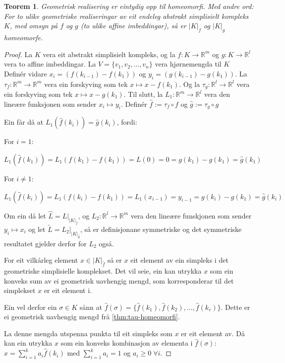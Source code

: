 \documentclass[a4paper, 12pt, norsk]{article}
\theoremstyle{plain}
\newtheorem{theorem}{Teorem}[section]
\theoremstyle{definition}
\newcommand{\Rb}{\mathbb{R}}
\newcommand{\gr}[1]{ \lvert #1 \rvert } %
\begin{document}
\begin{theorem} \label{thm:gr-eintydig}
	Geometrisk realisering er eintydig opp til homeomorfi. Med andre ord: For to ulike geometriske realiseringar av eit endeleg abstrakt simplisielt kompleks $K$, med omsyn på $f$ og $g$ (to ulike affine imbeddingar), så er $\gr{K}_f$ og $\gr{K}_g$ homeomorfe.
\end{theorem}

\begin{proof}
	La $K$ vera eit abstrakt simplisielt kompleks, og la $f:K\to\Rb^m$ og $g:K\to\Rb^l$ vera to affine imbeddingar. La $V=\{ v_1, v_2, \dots, v_n \}$ vera hjørnemengda til $K$ Definér vidare $x_i=(f(k_{i-1})-f(k_1))$ og $y_i=(g(k_{i-1})-g(k_1))$. La $\tau_f:\Rb^m\to\Rb^m$ vera ein forskyving som tek $x\mapsto x-f(k_1)$. Og la $\tau_g:\Rb^l\to\Rb^l$ vera ein forskyving som tek $x\mapsto x-g(k_1)$. Til slutt, la $L_1:\Rb^m\to\Rb^l$ vera den lineære funksjonen som sender $x_i\mapsto y_i$. Definér $\hat{f}:=\tau_f\circ f$ og $\hat{g}:=\tau_g \circ g$
	
	Ein får då at $L_1(\hat{f}(k_i))=\hat{g}(k_i)$, fordi:
	
	For $i=1$:

	\[
		L_1(\hat{f}(k_1))=L_1(f(k_1)-f(k_1))=L(0)=0=g(k_1)-g(k_1)=\hat{g}(k_1)
	\]

	For $i\neq 1$:

	\[
		L_1(\hat{f}(k_i))=L_1(f(k_i)-f(k_1))=L_1(x_{i-1})=y_{i-1}=g(k_i)-g(k_1)=\hat{g}(k_i)
	\]

	Om ein då let $\hat{L}=L|_{\gr{K}_{\hat{f}}}$, og $L_2:\Rb^l\to\Rb^m$ vera den lineære funskjonen som sender $y_i\mapsto x_i$ og let $\tilde{L}=L_2|_{\gr{K}_{\hat{g}}}$, så er definisjonane symmetriske og det symmetriske resultatet gjelder derfor for $L_2$ også.

	For eit vilkårleg element $x\in\gr{K}_{\hat{f}}$ så er $x$ eit element av ein simpleks i det geometriske simplisielle komplekset. Det vil seie, ein kan utrykka $x$ som ein konveks sum av ei geometrisk uavhengig mengd, som korresponderar til det simplekset $x$ er eit element i.
	
	Ein vel derfor ein $\sigma\in K$ sånn at $\hat{f}(\sigma)=\{\hat{f}(k_1), \hat{f}(k_2), \dots, \hat{f}(k_r)\}$. Dette er ei geometrisk uavhengig mengd frå \autoref{thm:tau-homeomorfi}.
	
	La denne mengda utspenna punkta til eit simpleks som $x$ er eit element av. Då kan ein utrykka $x$ som ein konveks kombinasjon av elementa i $\hat{f}(\sigma)$: $x=\sum_{i=1}^ka_i\hat{f}(k_i)$ med $\sum_{i=1}^ka_i=1$ og $a_i\geq0\; \forall i$. 
	

\end{proof}
\end{document}
